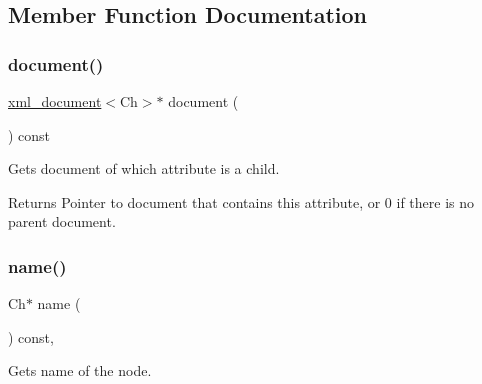 \subsection{Member Function Documentation}
\mbox{\label{classrapidxml_1_1xml__attribute_ae5396d92d09394b37838f2518f430da4}} 
\subsubsection{\texorpdfstring{document()}{document()}}
{\footnotesize\ttfamily \mbox{\hyperlink{classrapidxml_1_1xml__document}{xml\+\_\+document}}$<$Ch$>$$\ast$ document (\begin{DoxyParamCaption}{ }\end{DoxyParamCaption}) const\hspace{0.3cm}{\ttfamily [inline]}}



Gets document of which attribute is a child. 

\begin{DoxyReturn}{Returns}
Pointer to document that contains this attribute, or 0 if there is no parent document. 
\end{DoxyReturn}
\mbox{\label{classrapidxml_1_1xml__base_af8436e9ee14c127220113eaa956eafee}} 
\subsubsection{\texorpdfstring{name()}{name()}\hspace{0.1cm}{\footnotesize\ttfamily [1/3]}}
{\footnotesize\ttfamily Ch$\ast$ name (\begin{DoxyParamCaption}{ }\end{DoxyParamCaption}) const\hspace{0.3cm}{\ttfamily [inline]}, {\ttfamily [inherited]}}



Gets name of the node. 

